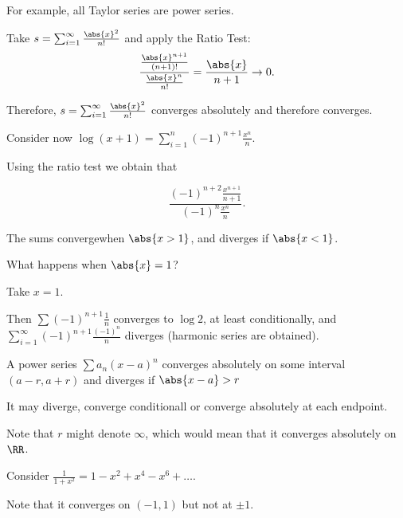 \documentclass[11pt]{scrartcl}
\begin{document}
For example, all Taylor series are power series.

Take $s=\sum_{i=1}^{\infty} \frac{\abs{x}^2}{n!}$ and apply the Ratio Test:
\begin{equation*}
  \frac{\frac{\abs{x}^{n+1}}{(n+1)!}}{\frac{\abs{x}^n}{n!}} = \frac{\abs{x}}{n+1}\to 0.
\end{equation*}

Therefore, $s=\sum_{i=1}^{\infty} \frac{\abs{x}^2}{n!}$ converges
absolutely and therefore converges.

Consider now $\log (x+1) = \sum_{i=1}^n(-1)^{n+1}\frac{x^n}{n}$.

Using the ratio test we obtain that 

\begin{equation*}
  \frac{(-1)^{n+2}\frac{x^{n+1}}{n+1}}{(-1)^n \frac{x^{n}}{n}}.
\end{equation*}

The sums convergewhen $\abs{x> 1}$, and diverges if $\abs{x< 1}$.

What happens when $\abs{x}=1$?

Take $x=1$.

Then $\sum (-1)^{n+1}\frac{1}{n}$ converges to $\log 2$, at least
conditionally, and $\sum_{i=1}^{\infty}(-1)^{n+1}\frac{(-1)^n}{n}$ diverges (harmonic series are obtained).

\begin{theorem}
  A power series $\sum a_n(x-a)^n$ converges absolutely on some
  interval $(a-r, a+r)$ and diverges if $\abs{x-a}> r$ 

  It may diverge, converge conditionall or converge absolutely at each endpoint.
\end{theorem}

\begin{remark}
Note that $r$ might denote $\infty$, which would mean that it converges absolutely on $\RR$.
\end{remark}

\begin{example}

Consider $\frac{1}{1+x^2} = 1-x^2+x^4-x^6+\dots$.

Note that it converges on $(-1, 1)$ but not at $\pm 1$.

\end{example}
\end{document}
